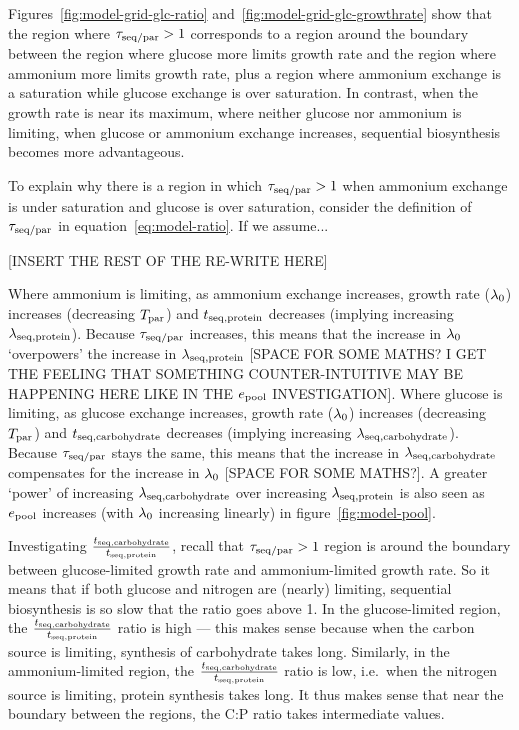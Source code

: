 Figures~\ref{fig:model-grid-glc-ratio} and~\ref{fig:model-grid-glc-growthrate} show that the region where $\tau_{\mathrm{seq}/\mathrm{par}} > 1$ corresponds to a region around the boundary between the region where glucose more limits growth rate and the region where ammonium more limits growth rate, plus a region where ammonium exchange is a saturation while glucose exchange is over saturation.
In contrast, when the growth rate is near its maximum, where neither glucose nor ammonium is limiting, when glucose or ammonium exchange increases, sequential biosynthesis becomes more advantageous.

To explain why there is a region in which $\tau_{\mathrm{seq}/\mathrm{par}} > 1$ when ammonium exchange is under saturation and glucose is over saturation, consider the definition of $\tau_{\mathrm{seq}/\mathrm{par}}$ in equation~\ref{eq:model-ratio}.
If we assume...

[INSERT THE REST OF THE RE-WRITE HERE]



Where ammonium is limiting, as ammonium exchange increases, growth rate ($\lambda_{0}$) increases (decreasing $T_{\mathrm{par}}$) and $t_{\mathrm{seq},\mathrm{protein}}$ decreases (implying increasing $\lambda_{\mathrm{seq},\mathrm{protein}}$).
Because $\tau_{\mathrm{seq}/\mathrm{par}}$ increases, this means that the increase in $\lambda_{0}$ `overpowers' the increase in $\lambda_{\mathrm{seq},\mathrm{protein}}$ [SPACE FOR SOME MATHS?  I GET THE FEELING THAT SOMETHING COUNTER-INTUITIVE MAY BE HAPPENING HERE LIKE IN THE $e_{\mathrm{pool}}$ INVESTIGATION].
Where glucose is limiting, as glucose exchange increases, growth rate ($\lambda_{0}$) increases (decreasing $T_{\mathrm{par}}$) and $t_{\mathrm{seq},\mathrm{carbohydrate}}$ decreases (implying increasing $\lambda_{\mathrm{seq},\mathrm{carbohydrate}}$).
Because $\tau_{\mathrm{seq}/\mathrm{par}}$ stays the same, this means that the increase in $\lambda_{\mathrm{seq},\mathrm{carbohydrate}}$ compensates for the increase in $\lambda_{0}$ [SPACE FOR SOME MATHS?].
A greater `power' of increasing $\lambda_{\mathrm{seq},\mathrm{carbohydrate}}$ over increasing $\lambda_{\mathrm{seq},\mathrm{protein}}$ is also seen as $e_{\mathrm{pool}}$ increases (with $\lambda_{0}$ increasing linearly) in figure~\ref{fig:model-pool}.

Investigating $\frac{t_{\mathrm{seq},\mathrm{carbohydrate}}}{t_{\mathrm{seq},\mathrm{protein}}}$, recall that $\tau_{\mathrm{seq}/\mathrm{par}} > 1$ region is around the boundary between glucose-limited growth rate and ammonium-limited growth rate.
So it means that if both glucose and nitrogen are (nearly) limiting, sequential biosynthesis is so slow that the ratio goes above 1.
In the glucose-limited region, the $\frac{t_{\mathrm{seq},\mathrm{carbohydrate}}}{t_{\mathrm{seq},\mathrm{protein}}}$ ratio is high --- this makes sense because when the carbon source is limiting, synthesis of carbohydrate takes long.
Similarly, in the ammonium-limited region, the $\frac{t_{\mathrm{seq},\mathrm{carbohydrate}}}{t_{\mathrm{seq},\mathrm{protein}}}$ ratio is low, i.e.\ when the nitrogen source is limiting, protein synthesis takes long.
It thus makes sense that near the boundary between the regions, the C:P ratio takes intermediate values.

